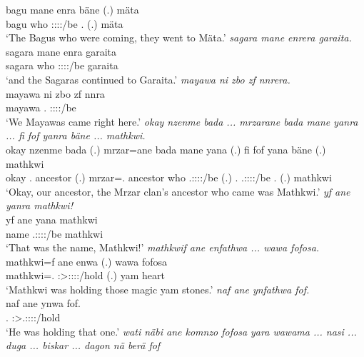 \begin{exe}
	\gll bagu mane enra bäne (.) mäta\\ 
	bagu who \Stpl:\Sbj:\Pst:\Ipfv:\Venit/be \Recog.{\Abs} (.) mäta\\
	\trans `The Bagus who were coming, they went to Mäta.'
\newpage 
{} 
	\emph{sagara mane enrera garaita.}\\
	\gll sagara mane enra garaita\\ 
	sagara who \Stpl:\Sbj:\Pst:\Ipfv:\Venit/be garaita\\
	\trans `and the Sagaras continued to Garaita.'
	\emph{mayawa ni zbo zf nnrera.}\\
	\gll mayawa ni zbo zf nnra\\ 
	mayawa {\Fnsg} \Prox.{\All} {\Imm} \Fpl:\Sbj:\Pst:\Ipfv:\Venit/be\\
	\trans `We Mayawas came right here.'
	\emph{okay nzenme bada ... mrzarane bada mane yanra ... fi fof yanra bäne ... mathkwi.}\\
	\gll okay nzenme bada (.) mrzar=ane bada mane yana (.) fi fof yana bäne (.) mathkwi\\ 
	okay \Fnsg.{\Poss} ancestor (.) mrzar=\Poss.{\Sg} ancestor who \Tsg.\Masc:\Sbj:\Pst:\Ipfv:\Venit/be (.) \Third.{\Abs} {\Emph} \Tsg.\Masc:\Sbj:\Pst:\Ipfv:\Venit/be \Recog.{\Abs} (.) mathkwi\\
	\trans `Okay, our ancestor, the Mrzar clan's ancestor who came was Mathkwi.'
	\emph{yf ane yanra mathkwi!}\\
	\gll yf ane yana mathkwi\\ 
	name {\Dem} \Tsg.\Masc:\Sbj:\Pst:\Ipfv:\Venit/be mathkwi\\
	\trans `That was the name, Mathkwi!'
	\emph{mathkwif ane enfathwa ... wawa fofosa.}\\
	\gll mathkwi=f ane enwa (.) wawa fofosa\\ 
	mathkwi=\Erg.{\Sg} {\Dem} \Sg:\Sbj>\Stpl:\Obj:\Pst:\Ipfv:\Venit/hold (.) yam heart\\
	\trans `Mathkwi was holding those magic yam stones.'
	\emph{naf ane ynfathwa fof.}\\
	\gll naf ane ynwa fof.\\ 
	\Tsg.{\Erg} {\Dem} \Sg:\Sbj>\Tsg.\Masc:\Obj:\Pst:\Ipfv:\Venit/hold \Emph\\
	\trans `He was holding that one.'
	\emph{wati näbi ane komnzo fofosa yara wawama ... nasi ... duga ... biskar ... dagon nä berä fof}\\

\end{exe}
